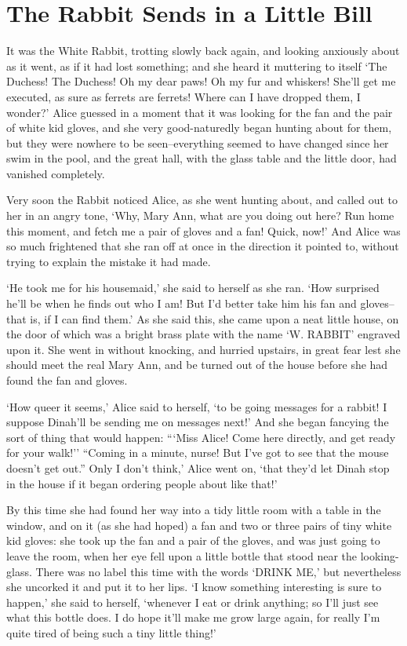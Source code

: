 \documentclass[statementpaper,twoside,openany]{memoir}
\begin{document}
\chapter{The Rabbit Sends in a Little Bill}

It was the White Rabbit, trotting slowly back again, and looking anxiously about as it went, as if it had lost something; and she heard it muttering to itself `The Duchess! The Duchess! Oh my dear paws! Oh my fur and whiskers! She'll get me executed, as sure as ferrets are ferrets! Where can I have dropped them, I wonder?' Alice guessed in a moment that it was looking for the fan and the pair of white kid gloves, and she very good-naturedly began hunting about for them, but they were nowhere to be seen--everything seemed to have changed since her swim in the pool, and the great hall, with the glass table and the little door, had vanished completely.

Very soon the Rabbit noticed Alice, as she went hunting about, and called out to her in an angry tone, `Why, Mary Ann, what are you doing out here? Run home this moment, and fetch me a pair of gloves and a fan! Quick, now!' And Alice was so much frightened that she ran off at once in the direction it pointed to, without trying to explain the mistake it had made.

`He took me for his housemaid,' she said to herself as she ran. `How surprised he'll be when he finds out who I am! But I'd better take him his fan and gloves--that is, if I can find them.' As she said this, she came upon a neat little house, on the door of which was a bright brass plate with the name `W. RABBIT' engraved upon it. She went in without knocking, and hurried upstairs, in great fear lest she should meet the real Mary Ann, and be turned out of the house before she had found the fan and gloves.

`How queer it seems,' Alice said to herself, `to be going messages for a rabbit! I suppose Dinah'll be sending me on messages next!' And she began fancying the sort of thing that would happen: ```Miss Alice! Come here directly, and get ready for your walk!'' ``Coming in a minute, nurse! But I've got to see that the mouse doesn't get out.'' Only I don't think,' Alice went on, `that they'd let Dinah stop in the house if it began ordering people about like that!'

By this time she had found her way into a tidy little room with a table in the window, and on it (as she had hoped) a fan and two or three pairs of tiny white kid gloves: she took up the fan and a pair of the gloves, and was just going to leave the room, when her eye fell upon a little bottle that stood near the looking-glass. There was no label this time with the words `DRINK ME,' but nevertheless she uncorked it and put it to her lips. `I know something interesting is sure to happen,' she said to herself, `whenever I eat or drink anything; so I'll just see what this bottle does. I do hope it'll make me grow large again, for really I'm quite tired of being such a tiny little thing!'
\end{document}
